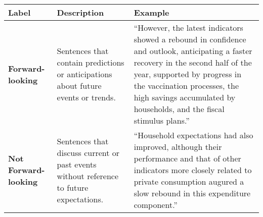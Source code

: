 \begin{table*}
    \caption{}
    \vspace{1em}
    \begin{tabular}{p{}p{}p{}}
    \toprule
    \textbf{Label} & \textbf{Description} & \textbf{Example}\\
    \midrule
    \textbf{Forward-looking} & Sentences that contain predictions or anticipations about
    future events or trends. & “However, the latest indicators showed a rebound in confidence and outlook, anticipating a faster recovery in the second half of the year, supported by progress in the vaccination processes, the high savings accumulated by households, and the fiscal stimulus plans.” \\
    \midrule
    \textbf{Not Forward-looking} & Sentences that discuss current or past events without reference to future expectations. & “Household expectations had also improved, although their performance and that of other indicators more closely related to private consumption augured a slow rebound in this expenditure component.” \\
    \bottomrule
    \end{tabular}
    \label{tb:cboc_forward_looking_guide}
    \end{table*}
    